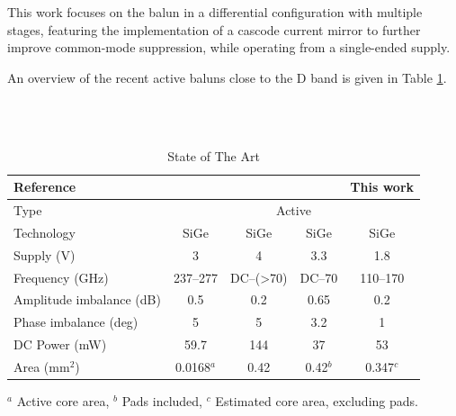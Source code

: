 This work focuses on the balun in a differential configuration with multiple stages, featuring the implementation of a cascode current mirror to further improve common-mode suppression, while operating from a single-ended supply. 

An overview of the recent active baluns close to the D band is given in Table \ref{tab:comparison}.

\mbox{}\\
\mbox{}\\

\begin{table}[h!]
\centering
\renewcommand{\arraystretch}{1.4} %
\begin{tabular}{|l|c|c|c|c|}
\hline
Reference & \cite{Active BALUN with 40 GHz bandwidth at 257 GHz} & \cite{Active Single-Ended to Differential Converter (Balun) for DC up to 70 GHz in 130 nm SiGe} & \cite{Ultra Broadband Low-Power 70 GHz Active Balun in 130-nm SiGe BiCMOS} & This work \\ 
\hline
Type & \multicolumn{4}{c|}{Active} \\ 
\hline
Technology & SiGe & SiGe & SiGe & SiGe \\ 
\hline
Supply (V) & 3 & 4 & 3.3 & 1.8 \\ 
\hline
Frequency (GHz) & 237--277 & DC--(>70) & DC--70 & 110--170 \\ 
\hline
Amplitude imbalance (dB) & 0.5 & 0.2 & 0.65 & 0.2 \\ 
\hline
Phase imbalance (deg) & 5 & 5 & 3.2 &  1 \\ 
\hline
DC Power (mW) & 59.7 & 144 & 37 & 53 \\ 
\hline
Area (mm$^2$) & 0.0168$^{a}$ & 0.42 & 0.42$^{b}$ & 0.347$^{c}$ \\ 
\hline
\end{tabular}
\par\vspace{0.1cm}
$^{a}$ Active core area, 
$^{b}$ Pads included, 
$^{c}$ Estimated core area, excluding pads.
\caption{State of The Art}
\label{tab:comparison}
\end{table}